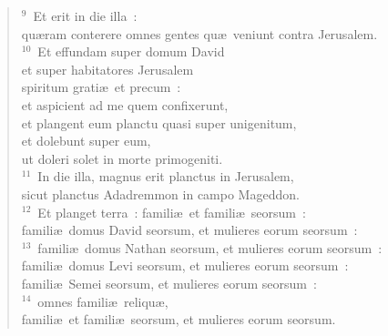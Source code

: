 \begin{verse}${}^{9}$~Et erit in die illa~:\\ qu\ae ram conterere omnes gentes qu\ae\ veniunt contra Jerusalem.\\
${}^{10}$~Et effundam super domum David\\ et super habitatores Jerusalem\\ spiritum grati\ae\ et precum~:\\ et aspicient ad me quem confixerunt,\\ et plangent eum planctu quasi super unigenitum,\\ et dolebunt super eum,\\ ut doleri solet in morte primogeniti.\\
${}^{11}$~In die illa, magnus erit planctus in Jerusalem,\\ sicut planctus Adadremmon in campo Mageddon.\\
${}^{12}$~Et planget terra~: famili\ae\ et famili\ae\ seorsum~:\\ famili\ae\ domus David seorsum, et mulieres eorum seorsum~:\\
${}^{13}$~famili\ae\ domus Nathan seorsum, et mulieres eorum seorsum~:\\ famili\ae\ domus Levi seorsum, et mulieres eorum seorsum~:\\ famili\ae\ Semei seorsum, et mulieres eorum seorsum~:\\
${}^{14}$~omnes famili\ae\ reliqu\ae ,\\ famili\ae\ et famili\ae\ seorsum, et mulieres eorum seorsum.\end{verse}


